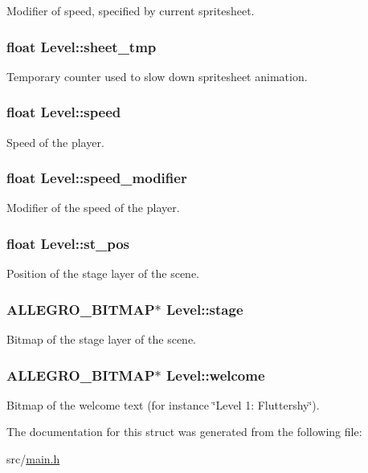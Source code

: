 \-Modifier of speed, specified by current spritesheet. \hypertarget{structLevel_a22e80ea91fd267dae85c0457e581d072}{
\subsubsection[{sheet\-\_\-tmp}]{\setlength{\rightskip}{0pt plus 5cm}float {\bf \-Level\-::sheet\-\_\-tmp}}}\label{structLevel_a22e80ea91fd267dae85c0457e581d072}
\-Temporary counter used to slow down spritesheet animation. \hypertarget{structLevel_a936a1d131d1e056878474ca831c5e88f}{
\subsubsection[{speed}]{\setlength{\rightskip}{0pt plus 5cm}float {\bf \-Level\-::speed}}}\label{structLevel_a936a1d131d1e056878474ca831c5e88f}
\-Speed of the player. \hypertarget{structLevel_a0f6fa70a2e0b85437dc1973d1409381f}{
\subsubsection[{speed\-\_\-modifier}]{\setlength{\rightskip}{0pt plus 5cm}float {\bf \-Level\-::speed\-\_\-modifier}}}\label{structLevel_a0f6fa70a2e0b85437dc1973d1409381f}
\-Modifier of the speed of the player. \hypertarget{structLevel_ab13f799d9e2e06a04debbd97676fb512}{
\subsubsection[{st\-\_\-pos}]{\setlength{\rightskip}{0pt plus 5cm}float {\bf \-Level\-::st\-\_\-pos}}}\label{structLevel_ab13f799d9e2e06a04debbd97676fb512}
\-Position of the stage layer of the scene. \hypertarget{structLevel_ad412b858a4e688114dd89a44ecb005bb}{
\subsubsection[{stage}]{\setlength{\rightskip}{0pt plus 5cm}\-A\-L\-L\-E\-G\-R\-O\-\_\-\-B\-I\-T\-M\-A\-P$\ast$ {\bf \-Level\-::stage}}}\label{structLevel_ad412b858a4e688114dd89a44ecb005bb}
\-Bitmap of the stage layer of the scene. \hypertarget{structLevel_a575fec7686bd94b5c35b15d73296c977}{
\subsubsection[{welcome}]{\setlength{\rightskip}{0pt plus 5cm}\-A\-L\-L\-E\-G\-R\-O\-\_\-\-B\-I\-T\-M\-A\-P$\ast$ {\bf \-Level\-::welcome}}}\label{structLevel_a575fec7686bd94b5c35b15d73296c977}
\-Bitmap of the welcome text (for instance \char`\"{}\-Level 1\-: Fluttershy\char`\"{}). 

\-The documentation for this struct was generated from the following file\-:\begin{DoxyCompactItemize}
\item 
src/\hyperlink{main_8h}{main.\-h}\end{DoxyCompactItemize}
